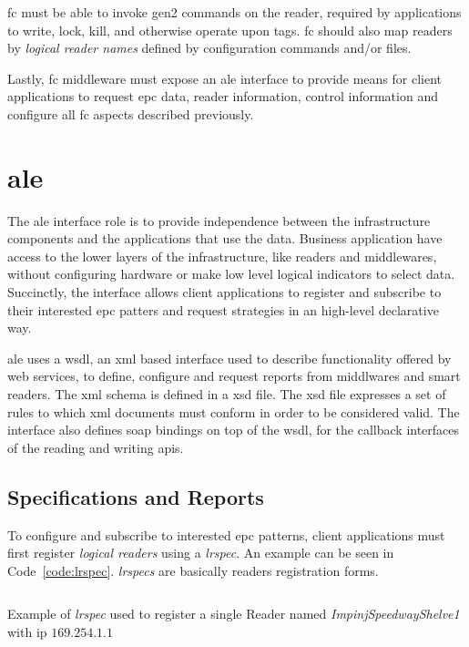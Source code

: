 \ac{fc} must be able to invoke \ac{gen2} commands on the reader, required by applications to write, lock, kill, and otherwise operate upon tags.
\ac{fc} should also map readers by \textit{logical reader names} defined by configuration commands and/or files.

Lastly, \ac{fc} middleware must expose an \ac{ale} interface to provide means for client applications to request \ac{epc} data, reader information, control information and configure all \ac{fc} aspects described previously.

\section{\acf{ale}}

The \ac{ale} interface role is to provide independence  between the infrastructure components and the applications that use the data.
Business application have access to the lower layers of the infrastructure, like readers and middlewares, without configuring hardware or make low level logical indicators to select data.
Succinctly, the interface allows client applications to register and subscribe to their interested \ac{epc} patters and request strategies in an high-level declarative way.

\ac{ale} uses a \ac{wsdl}, an \ac{xml} based interface used to describe functionality offered by web services, to define, configure and request reports from middlwares and smart readers.
The \ac{xml} schema is defined in a \ac{xsd} file. The \ac{xsd} file expresses a set of rules to which \ac{xml} documents must conform in order to be considered valid. 
The interface also defines \ac{soap} bindings on top of the \ac{wsdl}, for the callback interfaces of the reading and writing \acp{api}.

\subsection{Specifications and Reports}

To configure and subscribe to interested \ac{epc} patterns, client applications must first register \textit{logical readers} using a \emph{\acf{lrspec}}. An example can be seen in Code~\ref{code:lrspec}. \emph{\acp{lrspec}} are basically readers registration forms.

\begin{listing}
    \inputminted[linenos, breaklines]{xml}{./code/sota/LRSpec.xml}
    \caption{Example of \emph{\acs{lrspec}} used to register a single Reader named \textit{ImpinjSpeedwayShelve1} with \ac{ip} $169.254.1.1$}
    \label{code:lrspec}
\end{listing}

